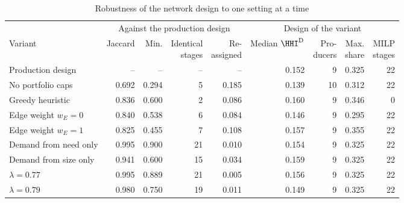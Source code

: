 \begin{table}[htbp]
\centering
\begin{threeparttable}
\caption{Robustness of the network design to one setting at a time}
\label{tab:network_robustness}
\footnotesize
\begin{tabular}{@{}l r r r r r r r r@{}}
\toprule
 & \multicolumn{4}{c}{Against the production design} & \multicolumn{4}{c}{Design of the variant} \\
\cmidrule(lr){2-5}\cmidrule(l){6-9}
Variant & Jaccard & Min. & \makecell[r]{Identical\\stages} & \makecell[r]{Re-\\assigned} & \makecell[r]{Median\\$\HHI^{\mathrm{D}}$} & \makecell[r]{Pro-\\ducers} & \makecell[r]{Max.\\share} & \makecell[r]{MILP\\stages} \\
\midrule
Production design & -- & -- & -- & -- & 0.152 & 9 & 0.325 & 22 \\
\addlinespace
No portfolio caps & 0.692 & 0.294 & 5 & 0.185 & 0.139 &   10 & 0.312 & 22 \\
Greedy heuristic & 0.836 & 0.600 & 2 & 0.086 & 0.160 &    9 & 0.346 & 0 \\
Edge weight $w_E=0$ & 0.840 & 0.538 & 6 & 0.084 & 0.146 &    9 & 0.295 & 22 \\
Edge weight $w_E=1$ & 0.825 & 0.455 & 7 & 0.108 & 0.157 &    9 & 0.355 & 22 \\
Demand from need only & 0.995 & 0.900 & 21 & 0.010 & 0.154 &    9 & 0.325 & 22 \\
Demand from size only & 0.941 & 0.600 & 15 & 0.034 & 0.159 &    9 & 0.325 & 22 \\
$\lambda=0.77$ & 0.995 & 0.889 & 21 & 0.005 & 0.156 &    9 & 0.325 & 22 \\
$\lambda=0.79$ & 0.980 & 0.750 & 19 & 0.011 & 0.149 &    9 & 0.325 & 22 \\
\bottomrule
\end{tabular}
\begin{tablenotes}[flushleft]\footnotesize

\end{tablenotes}
\end{threeparttable}
\end{table}
